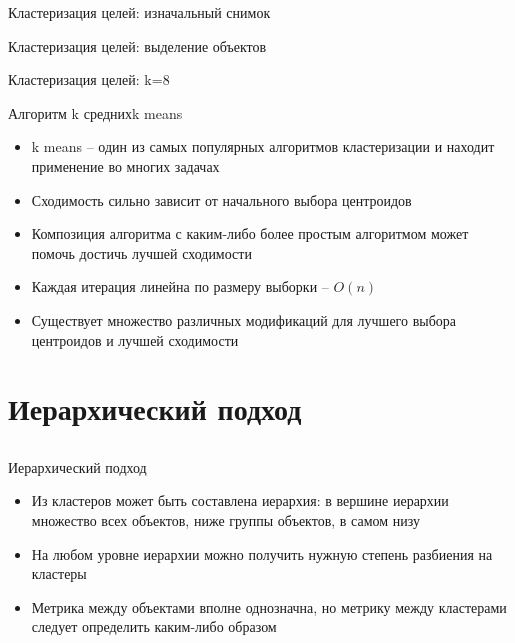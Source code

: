 \documentclass[compress,unicode]{beamer}
\begin{document}
\begin{frame}{Кластеризация целей: изначальный снимок}
\end{frame}

\begin{frame}{Кластеризация целей: выделение объектов}
\end{frame}

\begin{frame}{Кластеризация целей: k=8}
\end{frame}

\begin{frame}{Алгоритм k средних}{k means}
\begin{itemize}
\item k means -- один из самых популярных алгоритмов кластеризации и находит применение во многих задачах
\item Сходимость сильно зависит от начального выбора центроидов
\item Композиция алгоритма с каким-либо более простым алгоритмом может помочь достичь лучшей сходимости
\item Каждая итерация линейна по размеру выборки -- $O(n)$
\item Существует множество различных модификаций для лучшего выбора центроидов и лучшей сходимости 
\end{itemize}
\end{frame}

\section{Иерархический подход}
\subsection{}

\begin{frame}{Иерархический подход}
\begin{itemize}
	\item Из кластеров может быть составлена иерархия: в вершине иерархии множество всех объектов, ниже группы объектов, в самом низу 
	\item На любом уровне иерархии можно получить нужную степень разбиения на кластеры
	\item Метрика между объектами вполне однозначна, но метрику между кластерами следует определить каким-либо образом

\end{itemize}
\end{frame}
\end{document}
